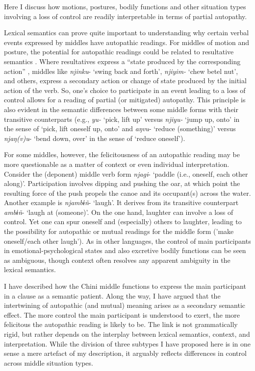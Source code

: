 \documentclass[output=paper]{langscibook}
\begin{document}
Here I discuss how motions, postures, bodily functions and other situation types involving a loss of control are readily interpretable in terms of partial autopathy.

 Lexical semantics can prove quite important to understanding why certain verbal events expressed by middles have autopathic readings. For middles of motion and posture, the potential for autopathic readings could be related to resultative semantics \citep{Nedjalkov1988}. Where resultatives express a “state produced by the corresponding action” \citep[498]{Kozinskij1988}, middles like \textit{njinku}- ‘swing back and forth’, \textit{njiyim-} ‘chew betel nut’, and others, express a secondary action or change of state produced by the initial action of the verb. So, one’s choice to participate in an event leading to a loss of control allows for a reading of partial (or mitigated) autopathy. This principle is also evident in the semantic differences between some middle forms with their transitive counterparts (e.g., \textit{yu-} ‘pick, lift up’ versus \textit{njiyu-} ‘jump up, onto’ in the sense of ‘pick, lift oneself up, onto’ and \textit{aŋvu}- ‘reduce (something)’ versus \textit{njaŋ(v)u}- ‘bend down, over’ in the sense of ‘reduce oneself’).

 For some middles, however, the felicitousness of an autopathic reading may be more questionable as a matter of context or even individual interpretation. Consider the (deponent) middle verb form \textit{njagi}- ‘paddle (i.e., oneself, each other along)’. Participation involves dipping and pushing the oar, at which point the resulting force of the push propels the canoe and its occupant(s) across the water. Another example is \textit{njambɨñ}- ‘laugh’. It derives from its transitive counterpart \textit{ambɨñ}- ‘laugh at (someone)’. On the one hand, laughter can involve a loss of control. Yet one can spur oneself and (especially) others to laughter, leading to the possibility for autopathic or mutual readings for the middle form ('make oneself/each other laugh'). As in other languages, the control of main participants in emotional-psychological states and also excretive bodily functions can be seen as ambiguous, though context often resolves any apparent ambiguity in the lexical semantics.

 I have described how the Chini middle functions to express the main participant in a clause as a semantic patient. Along the way, I have argued that the intertwining of autopathic (and mutual) meaning arises as a secondary semantic effect. The more control the main participant is understood to exert, the more felicitous the autopathic reading is likely to be. The link is not grammatically rigid, but rather depends on the interplay between lexical semantics, context, and interpretation. While the division of three subtypes I have proposed here is in one sense a mere artefact of my description, it arguably reflects differences in control across middle situation types.
\end{document}
